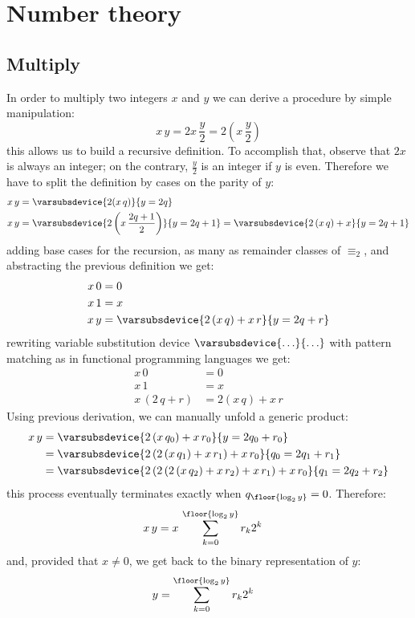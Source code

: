 
\chapter{Number theory}

\section{Multiply}

In order to multiply two integers $x$ and $y$ we can derive a procedure
by simple manipulation:
\begin{displaymath}
    x\,y = 2x\,\frac{y}{2} = 2\left(x\,\frac{y}{2}\right)
\end{displaymath}
this allows us to build a recursive definition. To accomplish that, observe
that $2x$ is always an integer; on the contrary, $\frac{y}{2}$ is an integer if $y$ is even.
Therefore we have to split the definition by cases on the parity of $y$:
\begin{align}
    x\,y &= \varsubsdevice{2(x\,q)}{y=2q}\\
    x\,y &= \varsubsdevice{2\left(x\,\frac{2q+1}{2}\right)}{y=2q+1}            
            = \varsubsdevice{2\left(x\,q\right)+x}{y=2q+1}
\end{align}
adding base cases for the recursion, as many as remainder classes of $\equiv_{2}$, and 
abstracting the previous definition we get:
\begin{align}
    x\,0 &= 0\\
    x\,1 &= x\\
    x\,y &= \varsubsdevice{2\left(x\,q\right)+x\,r}{y=2q+r}
\end{align}
rewriting variable substitution device $\varsubsdevice{\ldots}{\ldots}$ with pattern matching as in functional
programming languages we get:
\begin{align}
    x\,0 &= 0\\
    x\,1 &= x\\
    x\,(2\,q+r) &= 2\left(x\,q\right)+x\,r
\end{align}
Using previous derivation, we can manually unfold a generic product:
\begin{align}
    x\,y &= \varsubsdevice{2\left(x\,q_{0}\right)+x\,r_{0}}{y=2q_{0}+r_{0}}\\
         &= \varsubsdevice{2\left(2\left(x\,q_{1}\right)+x\,r_{1}\right)+x\,r_{0}}{q_{0}=2q_{1}+r_{1}}\\
         &= \varsubsdevice{2\left(2\left(2\left(x\,q_{2}\right)+x\,r_{2}\right)+x\,r_{1}\right)+x\,r_{0}}{q_{1}=2q_{2}+r_{2}}
\end{align}
this process eventually terminates exactly when $q_{\floor{\log_{2}{y}}}=0$. Therefore:
\begin{align}
    x\,y &= x\,\sum_{k=0}^{\floor{\log_{2}{y}}}{r_{k}2^{k}}
\end{align}
and, provided that $x\neq0$, we get back to the binary representation of $y$:
\begin{align}
    y &= \sum_{k=0}^{\floor{\log_{2}{y}}}{r_{k}2^{k}}
\end{align}
